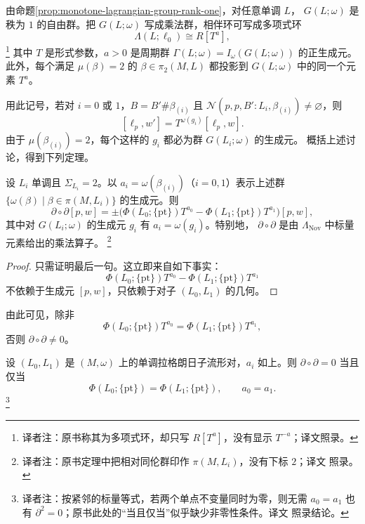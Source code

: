 由命题\ref{prop:monotone-lagrangian-group-rank-one}，对任意单调 $L$，
$G(L;\omega)$ 是秩为 $1$ 的自由\personAbel{}群。把 $G(L;\omega)$ 写成乘法群，相伴\personNovikov{}环可写成\personLaurent{}多项式环
\[
 \Lambda(L;\ell_0)\cong R[T^a],
\]
\footnote{译者注：原书称其为\personLaurent{}多项式环，却只写 $R[T^a]$，没有显示
$T^{-a}$；译文照录。}
其中 $T$ 是形式参数，$a>0$ 是周期群
$\Gamma(L;\omega)=I_\omega(G(L;\omega))$ 的正生成元。此外，每个满足
$\mu(\beta)=2$ 的 $\beta\in\pi_2(M,L)$ 都投影到
$G(L;\omega)$ 中的同一个元素 $T^a$。

用此记号，若对 $i=0$ 或 $1$，$B=B'\#\beta_{(i)}$ 且
$\mathcal N(p,p,B':L_i,\beta_{(i)})\neq\varnothing$，则
\[
 [\ell_p,w']=T^{\omega(g_i)}[\ell_p,w].
\]
由于 $\mu(\beta_{(i)})=2$，每个这样的 $g_i$ 都必为群 $G(L_i;\omega)$ 的生成元。
概括上述讨论，得到下列定理。

\begin{theorem}
\label{thm:boundary-square-monotone-maslov-two}
设 $L_i$ 单调且 $\Sigma_{L_i}=2$。以
$a_i=\omega(\beta_{(i)})$（$i=0,1$）表示上述群
$\{\omega(\beta)\mid\beta\in\pi(M,L_i)\}$ 的生成元。则
\begin{equation}
 \partial\circ\partial[p,w]
 =\pm\bigl(\Phi(L_0;\{\mathrm{pt}\})T^{a_0}
 -\Phi(L_1;\{\mathrm{pt}\})T^{a_1}\bigr)[p,w],
\label{eq:boundary-square-scalar}
\end{equation}
其中对 $G(L_i;\omega)$ 的生成元 $g_i$ 有 $a_i=\omega(g_i)$。特别地，
$\partial\circ\partial$ 是由 $\Lambda_{\mathrm{Nov}}$ 中标量元素给出的乘法算子。
\footnote{译者注：原书定理中把相对同伦群印作 $\pi(M,L_i)$，没有下标 $2$；译文
照录。}
\end{theorem}

\begin{proof}
只需证明最后一句。这立即来自如下事实：
\[
 \Phi(L_0;\{\mathrm{pt}\})T^{a_0}
 -\Phi(L_1;\{\mathrm{pt}\})T^{a_1}
\]
不依赖于生成元 $[p,w]$，只依赖于对子 $(L_0,L_1)$ 的几何。
\end{proof}

由此可见，除非
\[
 \Phi(L_0;\{\mathrm{pt}\})T^{a_0}
 =\Phi(L_1;\{\mathrm{pt}\})T^{a_1},
\]
否则 $\partial\circ\partial\neq0$。

\begin{corollary}
\label{cor:criterion-boundary-square-zero}
设 $(L_0,L_1)$ 是 $(M,\omega)$ 上的单调拉格朗日子流形对，$a_i$ 如上。则
$\partial\circ\partial=0$ 当且仅当
\[
 \Phi(L_0;\{\mathrm{pt}\})=\Phi(L_1;\{\mathrm{pt}\}),
 \qquad a_0=a_1.
\]
\footnote{译者注：按紧邻的标量等式，若两个单点不变量同时为零，则无需
$a_0=a_1$ 也有 $\partial^2=0$；原书此处的“当且仅当”似乎缺少非零性条件。译文
照录结论。}
\end{corollary}


